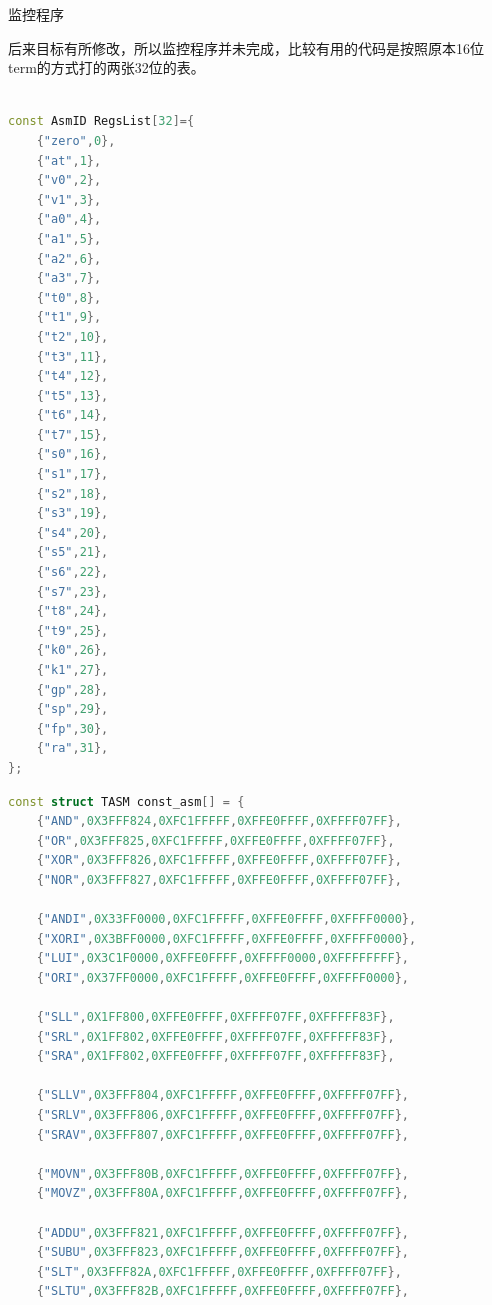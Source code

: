 \documentclass[UTF8,fntef,a4paper]{article}
\makeatletter
\renewcommand{\section}{\@startsection{section}{1}{0mm}
  {1.5\baselineskip}{0.5\baselineskip}{\bf\leftline}}
\makeatother
\begin{document}
\begin{CJK*}{UTF8}{kai}

\newpage

\newpage
\section{监控程序}

后来目标有所修改，所以监控程序并未完成，比较有用的代码是按照原本16位term的方式打的两张32位的表。
\begin{lstlisting}[language={C++},keywordstyle=\color{blue!70},commentstyle=\color{red!50!green!50!blue!50},frame=shadowbox, rulesepcolor=\color{red!20!green!20!blue!20}] 

const AsmID RegsList[32]={
	{"zero",0},
	{"at",1},
	{"v0",2},
	{"v1",3},
	{"a0",4},
	{"a1",5},
	{"a2",6},
	{"a3",7},
	{"t0",8},
	{"t1",9},
	{"t2",10},
	{"t3",11},
	{"t4",12},
	{"t5",13},
	{"t6",14},
	{"t7",15},
	{"s0",16},
	{"s1",17},
	{"s2",18},
	{"s3",19},
	{"s4",20},
	{"s5",21},
	{"s6",22},
	{"s7",23},
	{"t8",24},
	{"t9",25},
	{"k0",26},
	{"k1",27},
	{"gp",28},
	{"sp",29},
	{"fp",30},
	{"ra",31},
};

\end{lstlisting}
\newpage
\begin{lstlisting}[language={C++},keywordstyle=\color{blue!70},commentstyle=\color{red!50!green!50!blue!50},frame=shadowbox, rulesepcolor=\color{red!20!green!20!blue!20}] 
const struct TASM const_asm[] = {
    {"AND",0X3FFF824,0XFC1FFFFF,0XFFE0FFFF,0XFFFF07FF},
    {"OR",0X3FFF825,0XFC1FFFFF,0XFFE0FFFF,0XFFFF07FF},
    {"XOR",0X3FFF826,0XFC1FFFFF,0XFFE0FFFF,0XFFFF07FF},
    {"NOR",0X3FFF827,0XFC1FFFFF,0XFFE0FFFF,0XFFFF07FF},
    
    {"ANDI",0X33FF0000,0XFC1FFFFF,0XFFE0FFFF,0XFFFF0000},
    {"XORI",0X3BFF0000,0XFC1FFFFF,0XFFE0FFFF,0XFFFF0000},
    {"LUI",0X3C1F0000,0XFFE0FFFF,0XFFFF0000,0XFFFFFFFF},
    {"ORI",0X37FF0000,0XFC1FFFFF,0XFFE0FFFF,0XFFFF0000},

    {"SLL",0X1FF800,0XFFE0FFFF,0XFFFF07FF,0XFFFFF83F},
    {"SRL",0X1FF802,0XFFE0FFFF,0XFFFF07FF,0XFFFFF83F},
    {"SRA",0X1FF802,0XFFE0FFFF,0XFFFF07FF,0XFFFFF83F},

    {"SLLV",0X3FFF804,0XFC1FFFFF,0XFFE0FFFF,0XFFFF07FF},
    {"SRLV",0X3FFF806,0XFC1FFFFF,0XFFE0FFFF,0XFFFF07FF},
    {"SRAV",0X3FFF807,0XFC1FFFFF,0XFFE0FFFF,0XFFFF07FF},

    {"MOVN",0X3FFF80B,0XFC1FFFFF,0XFFE0FFFF,0XFFFF07FF},
    {"MOVZ",0X3FFF80A,0XFC1FFFFF,0XFFE0FFFF,0XFFFF07FF},

    {"ADDU",0X3FFF821,0XFC1FFFFF,0XFFE0FFFF,0XFFFF07FF},
    {"SUBU",0X3FFF823,0XFC1FFFFF,0XFFE0FFFF,0XFFFF07FF},
    {"SLT",0X3FFF82A,0XFC1FFFFF,0XFFE0FFFF,0XFFFF07FF},
    {"SLTU",0X3FFF82B,0XFC1FFFFF,0XFFE0FFFF,0XFFFF07FF},


\end{lstlisting}
\end{CJK*}
\end{document}
